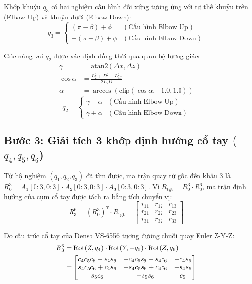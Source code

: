 Khớp khuỷu $q_3$ có hai nghiệm cấu hình đối xứng tương ứng với tư thế khuỷu trên (Elbow Up) và khuỷu dưới (Elbow Down):
\begin{equation}
    q_3 = \begin{cases}
        (\pi - \beta) + \phi & (\text{Cấu hình Elbow Up}) \\
        -(\pi - \beta) + \phi & (\text{Cấu hình Elbow Down})
    \end{cases}
\end{equation}

Góc nâng vai $q_2$ được xác định đồng thời qua quan hệ lượng giác:
\begin{align}
    \gamma &= \text{atan2}(\Delta x, \Delta z) \\
    \cos\alpha &= \frac{L_2^2 + D^2 - L_{\text{eff}}^2}{2 L_2 D} \\
    \alpha &= \arccos\left(\text{clip}(\cos\alpha, -1.0, 1.0)\right)
\end{align}
\begin{equation}
    q_2 = \begin{cases}
        \gamma - \alpha & (\text{Cấu hình Elbow Up}) \\
        \gamma + \alpha & (\text{Cấu hình Elbow Down})
    \end{cases}
\end{equation}

\subsection{Bước 3: Giải tích 3 khớp định hướng cổ tay ($q_4, q_5, q_6$)}

Từ bộ nghiệm $(q_1, q_2, q_3)$ đã tìm được, ma trận quay từ gốc đến khâu 3 là $R_0^3 = A_1[0:3, 0:3] \cdot A_2[0:3, 0:3] \cdot A_3[0:3, 0:3]$. Vì $R_{\text{tgt}} = R_0^3 \cdot R_3^6$, ma trận định hướng của cụm cổ tay được tách ra bằng tích chuyển vị:
\begin{equation}
    R_3^6 = (R_0^3)^T \cdot R_{\text{tgt}} = \begin{bmatrix}
        r_{11} & r_{12} & r_{13} \\
        r_{21} & r_{22} & r_{23} \\
        r_{31} & r_{32} & r_{33}
    \end{bmatrix}
\end{equation}

Do cấu trúc cổ tay của Denso VS-6556 tương đương chuỗi quay Euler Z-Y-Z:
\begin{align}
    R_3^6 &= \text{Rot}(Z, q_4) \cdot \text{Rot}(Y, -q_5) \cdot \text{Rot}(Z, q_6) \notag \\
    &= \begin{bmatrix}
        c_4 c_5 c_6 - s_4 s_6 & -c_4 c_5 s_6 - s_4 c_6 & -c_4 s_5 \\
        s_4 c_5 c_6 + c_4 s_6 & -s_4 c_5 s_6 + c_4 c_6 & -s_4 s_5 \\
        s_5 c_6               & -s_5 s_6               & c_5
    \end{bmatrix}
\end{align}

